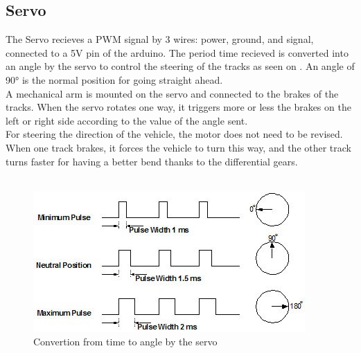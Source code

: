 \subsection{Servo}

The Servo recieves a PWM signal by 3 wires: power, ground, and signal, connected to a 5V pin of the arduino. The period time recieved is converted into an angle by the servo to control the steering of the tracks as seen on . An angle of 90° is the normal position for going straight ahead.\\

A mechanical arm is mounted on the servo and connected to the brakes of the tracks. When the servo rotates one way, it triggers more or less the brakes on the left or right side according to the value of the angle sent.\\

For steering the direction of the vehicle, the motor does not need to be revised. When one track brakes, it forces the vehicle to turn this way, and the other track turns faster for having a better bend thanks to the differential gears.\\\\


\begin{figure}[H]
	\centering
	\includegraphics[scale=1]{figures/timeVSangle.jpg}
	\caption{Convertion from time to angle by the servo\cite {AServos}}
	\label{timeVSangle}
\end{figure}
